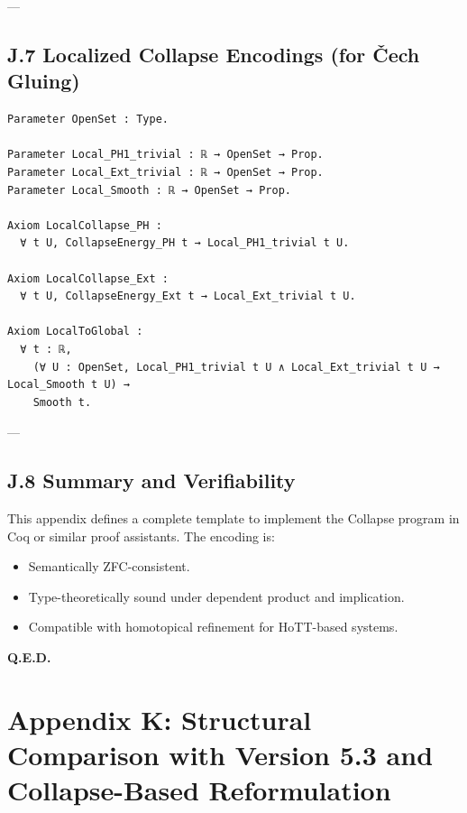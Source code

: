 \documentclass[11pt]{article}
\begin{document}
{{---

\subsection*{J.7 Localized Collapse Encodings (for Čech Gluing)}

\begin{lstlisting}[language=Coq]
Parameter OpenSet : Type.

Parameter Local_PH1_trivial : ℝ → OpenSet → Prop.
Parameter Local_Ext_trivial : ℝ → OpenSet → Prop.
Parameter Local_Smooth : ℝ → OpenSet → Prop.

Axiom LocalCollapse_PH :
  ∀ t U, CollapseEnergy_PH t → Local_PH1_trivial t U.

Axiom LocalCollapse_Ext :
  ∀ t U, CollapseEnergy_Ext t → Local_Ext_trivial t U.

Axiom LocalToGlobal :
  ∀ t : ℝ,
    (∀ U : OpenSet, Local_PH1_trivial t U ∧ Local_Ext_trivial t U → Local_Smooth t U) →
    Smooth t.
\end{lstlisting}

---

\subsection*{J.8 Summary and Verifiability}

This appendix defines a complete template to implement the Collapse program in Coq or similar proof assistants.  
The encoding is:
\begin{itemize}
  \item Semantically ZFC-consistent.
  \item Type-theoretically sound under dependent product and implication.
  \item Compatible with homotopical refinement for HoTT-based systems.
\end{itemize}

\begin{flushright}
\textbf{Q.E.D.}
\end{flushright}




\section*{Appendix K: Structural Comparison with Version 5.3 and Collapse-Based Reformulation}

}}
\end{document}

